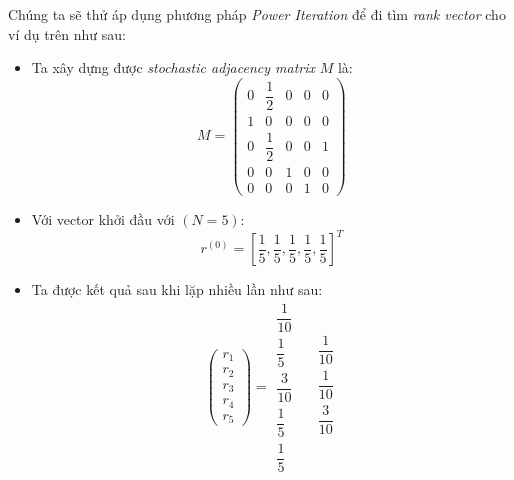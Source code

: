 Chúng ta sẽ thử áp dụng phương pháp \emph{Power Iteration} để đi tìm \emph{rank vector} cho ví dụ trên như sau:\\
\begin{itemize}
     \item Ta xây dựng được \emph{stochastic adjacency matrix} $M$ là:
     $$ M = 
            \begin{pmatrix}
                  0 & \dfrac{1}{2} & 0 & 0 & 0 \\[10pt]
                1 & 0 & 0 & 0 & 0 \\[10pt]
                0 & \dfrac{1}{2} & 0 & 0 & 1 \\[10pt]
                0 & 0 & 1 & 0 & 0 \\[10pt]
                0 & 0 & 0 & 1 & 0
            \end{pmatrix}
    $$
    \item Với vector khởi đầu với $(N = 5)$: 
             $$
                        r^{(0)} = \left[\frac{1}{5},\frac{1}{5},\frac{1}{5},\frac{1}{5},\frac{1}{5}\right] ^ T 
            $$
    \item Ta được kết quả sau khi lặp nhiều lần như sau: \\
                $$
                \begin{pmatrix}
                    r_1 \\[15pt]
                    r_2 \\[15pt]
                    r_3 \\[15pt]
                    r_4 \\[15pt]
                    r_5 
                \end{pmatrix}
                =
                \begin{matrix}
                    \dfrac{1}{10} \\[10pt]
                    \dfrac{1}{5} \\[10pt]
                    \dfrac{3}{10}\\[10pt]
                    \dfrac{1}{5} \\[10pt]
                    \dfrac{1}{5}
                \end{matrix}
                \quad
                \begin{matrix}
                    \dfrac{1}{10} \\[10pt]
                    \dfrac{1}{10} \\[10pt]
                    \dfrac{3}{10}\\[10pt]

\end{matrix}$$
\end{itemize}
